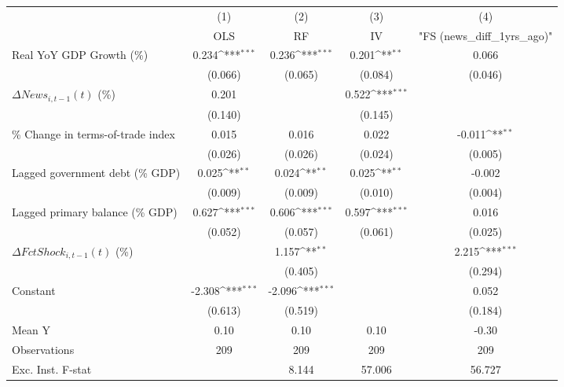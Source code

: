 {
\def\sym#1{\ifmmode^{#1}\else\(^{#1}\)\fi}
\begin{tabular}{l*{4}{c}}
\toprule
                    &\multicolumn{1}{c}{(1)}&\multicolumn{1}{c}{(2)}&\multicolumn{1}{c}{(3)}&\multicolumn{1}{c}{(4)}\\
                    &\multicolumn{1}{c}{OLS}&\multicolumn{1}{c}{RF}&\multicolumn{1}{c}{IV}&\multicolumn{1}{c}{ "FS (news_diff_1yrs_ago)" }\\
\midrule
Real YoY GDP Growth (\%)&       0.234\sym{***}&       0.236\sym{***}&       0.201\sym{**} &       0.066         \\
                    &     (0.066)         &     (0.065)         &     (0.084)         &     (0.046)         \\
\addlinespace
$ \Delta News_{i,t-1}(t)$ (\%)&       0.201         &                     &       0.522\sym{***}&                     \\
                    &     (0.140)         &                     &     (0.145)         &                     \\
\addlinespace
\% Change in terms-of-trade index&       0.015         &       0.016         &       0.022         &      -0.011\sym{**} \\
                    &     (0.026)         &     (0.026)         &     (0.024)         &     (0.005)         \\
\addlinespace
Lagged government debt (\% GDP)&       0.025\sym{**} &       0.024\sym{**} &       0.025\sym{**} &      -0.002         \\
                    &     (0.009)         &     (0.009)         &     (0.010)         &     (0.004)         \\
\addlinespace
Lagged primary balance (\% GDP)&       0.627\sym{***}&       0.606\sym{***}&       0.597\sym{***}&       0.016         \\
                    &     (0.052)         &     (0.057)         &     (0.061)         &     (0.025)         \\
\addlinespace
$ \Delta FctShock_{i,t-1}(t)$ (\%)&                     &       1.157\sym{**} &                     &       2.215\sym{***}\\
                    &                     &     (0.405)         &                     &     (0.294)         \\
\addlinespace
Constant            &      -2.308\sym{***}&      -2.096\sym{***}&                     &       0.052         \\
                    &     (0.613)         &     (0.519)         &                     &     (0.184)         \\
\midrule
Mean Y              &        0.10         &        0.10         &        0.10         &       -0.30         \\
Observations        &         209         &         209         &         209         &         209         \\
Exc. Inst. F-stat   &                     &       8.144         &      57.006         &      56.727         \\
\bottomrule
\end{tabular}
}
